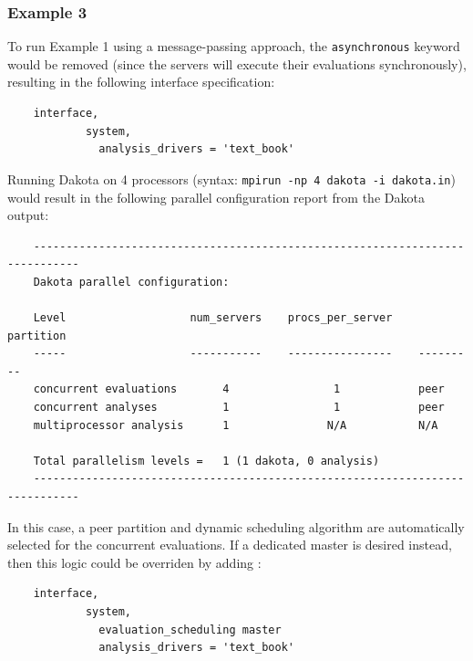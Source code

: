 \subsubsection{Example 3}\label{parallel:spec:multi:example3}

To run Example 1 using a message-passing approach, the
\texttt{asynchronous} keyword would be removed (since the servers will
execute their evaluations synchronously), resulting in the following
interface specification:
\begin{small}
\begin{verbatim}
    interface,
            system,
              analysis_drivers = 'text_book'
\end{verbatim}
\end{small}

Running Dakota on 4 processors (syntax: \texttt{mpirun -np 4 dakota -i
  dakota.in}) would result in the following parallel configuration
report from the Dakota output:
\begin{small}
\begin{verbatim}
    -----------------------------------------------------------------------------
    Dakota parallel configuration:

    Level                   num_servers    procs_per_server    partition
    -----                   -----------    ----------------    ---------
    concurrent evaluations       4                1            peer
    concurrent analyses          1                1            peer
    multiprocessor analysis      1               N/A           N/A

    Total parallelism levels =   1 (1 dakota, 0 analysis)
    -----------------------------------------------------------------------------
\end{verbatim}
\end{small}

In this case, a peer partition and dynamic scheduling algorithm are
automatically selected for the concurrent evaluations. If a dedicated
master is desired instead, then this logic could be overriden by adding
 :
\begin{small}
\begin{verbatim}
    interface,
            system,
              evaluation_scheduling master
              analysis_drivers = 'text_book'
\end{verbatim}
\end{small}


